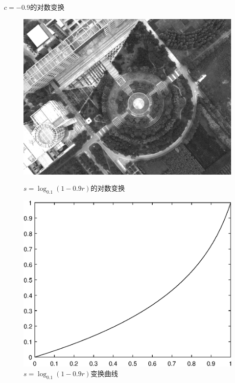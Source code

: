$c=-0.9$的对数变换
\begin{figure}[H]
	\centering
	\begin{minipage}{0.45\linewidth}
		\includegraphics[width=\linewidth]{figure/DJI_0027_Log_-90.png}
		\caption{$s=\log_{0.1}(1-0.9r)$的对数变换}
	\end{minipage}
	\begin{minipage}{0.45\linewidth}
		\includegraphics[width=\linewidth]{figure/DJI_0027_Log_-90_Graph.eps}
		\caption{$s=\log_{0.1}(1-0.9r)$变换曲线}
	\end{minipage}
\end{figure}
